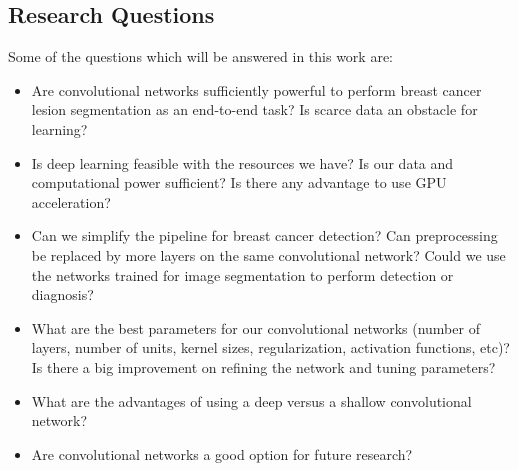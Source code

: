 \subsection{Research Questions}
Some of the questions which will be answered in this work are:
\begin{itemize} 
	\item Are convolutional networks sufficiently powerful to perform breast cancer lesion segmentation as an end-to-end task? Is scarce data an obstacle for learning?
	\item Is deep learning feasible with the resources we have? Is our data and computational power sufficient? Is there any advantage to use GPU acceleration?
	\item Can we simplify the pipeline for breast cancer detection? Can preprocessing be replaced by more layers on the same convolutional network? Could we use the networks trained for image segmentation to perform detection or diagnosis?
	\item What are the best parameters for our convolutional networks (number of layers, number of units, kernel sizes, regularization, activation functions, etc)? Is there a big improvement on refining the network and tuning parameters?
	\item What are the advantages of using a deep versus a shallow convolutional network? 
	\item Are convolutional networks a good option for future research?
\end{itemize}
